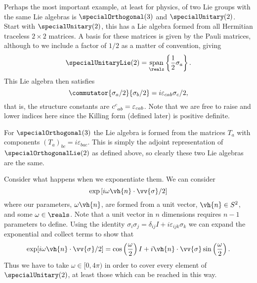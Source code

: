 \documentclass[fleqn]{NotesClass}
\newcommand{\sphere}[1][n]{S^{#1}}
\DeclareMathOperator*{\spn}{span}
\begin{document}
    \begin{exm}{}{}
        Perhaps the most important example, at least for physics, of two Lie groups with the same Lie algebras is \(\specialOrthogonal(3)\) and \(\specialUnitary(2)\).
        Start with \(\specialUnitary(2)\), this has a Lie algebra formed from all Hermitian traceless \(2 \times 2\) matrices.
        A basis for these matrices is given by the Pauli matrices, although to we include a factor of \(1/2\) as a matter of convention, giving
        \begin{equation}
            \specialUnitaryLie(2) = \spn_{\reals} \left\{ \frac{1}{2}\sigma_a \right\}.
        \end{equation}
        This Lie algebra then satisfies
        \begin{equation}
            \commutator{\sigma_a/2}{\sigma_b/2} = i\varepsilon_{cab}\sigma_c/2,
        \end{equation}
        that is, the structure constants are \(\tensor{c}{^c_{ab}} = \varepsilon_{cab}\).
        Note that we are free to raise and lower indices here since the Killing form (defined later) is positive definite.
        
        For \(\specialOrthogonal(3)\) the Lie algebra is formed from the matrices \(T_a\) with components \((T_a)_{bc} = i\varepsilon_{bac}\).
        This is simply the adjoint representation of \(\specialOrthogonalLie(2)\) as defined above, so clearly these two Lie algebras are the same.
        
        Consider what happens when we exponentiate them.
        We can consider
        \begin{equation}
            \exp\left[ i\omega \vh{n} \cdot \vv{\sigma}/2 \right]
        \end{equation}
        where our parameters, \(\omega\vh{n}\), are formed from a unit vector, \(\vh{n} \in \sphere[2]\), and some \(\omega \in \reals\).
        Note that a unit vector in \(n\) dimensions requires \(n - 1\) parameters to define.
        Using the identity \(\sigma_i \sigma_j = \delta_{ij}I + i\varepsilon_{ijk}\sigma_k\) we can expand the exponential and collect terms to show that
        \begin{equation}
            \exp[i\omega \vh{n} \cdot \vv{\sigma} /2] = \cos\left( \frac{\omega}{2} \right) I + i\vh{n} \cdot \vv{\sigma} \sin\left( \frac{\omega}{2} \right).
        \end{equation}
        Thus we have to take \(\omega \in [0, 4\pi)\) in order to cover every element of \(\specialUnitary(2)\), at least those which can be reached in this way.
        

\end{exm}
\end{document}
